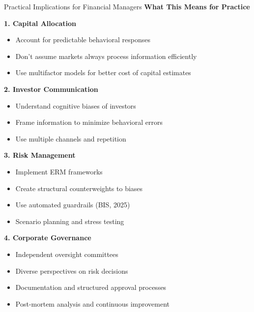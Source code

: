 \documentclass[aspectratio=169,10pt]{beamer}
\renewcommand{\small}{\fontsize{7pt}{8.5pt}\selectfont}
\renewcommand{\large}{\fontsize{9pt}{11pt}\selectfont}
\newcommand{\question}[1]{{\large\bfseries\color{crimson}#1}}
\begin{document}
	\begin{frame}{Practical Implications for Financial Managers}
		\question{What This Means for Practice}
		\small
		
		\textbf{1. Capital Allocation}
		\begin{itemize}
			\item Account for predictable behavioral responses
			\item Don't assume markets always process information efficiently
			\item Use multifactor models for better cost of capital estimates
		\end{itemize}
		
		\vspace{0.1cm}
		\textbf{2. Investor Communication}
		\begin{itemize}
			\item Understand cognitive biases of investors
			\item Frame information to minimize behavioral errors
			\item Use multiple channels and repetition
		\end{itemize}
		
		\vspace{0.1cm}
		\textbf{3. Risk Management}
		\begin{itemize}
			\item Implement ERM frameworks
			\item Create structural counterweights to biases
			\item Use automated guardrails (BIS, 2025)
			\item Scenario planning and stress testing
		\end{itemize}
		
		\vspace{0.1cm}
		\textbf{4. Corporate Governance}
		\begin{itemize}
			\item Independent oversight committees
			\item Diverse perspectives on risk decisions
			\item Documentation and structured approval processes
			\item Post-mortem analysis and continuous improvement
		\end{itemize}
	\end{frame}
	
	
\end{document}

